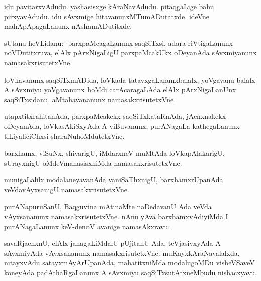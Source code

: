\documentclass{article}
\begin{document}
\begin{mn}
idu pavitarxvAdudu. yashasisxge kAraNavAdudu. pitaqgaLige bahu
pirxyavAdudu. idu sAvxmige hitavanunxMTumADutatxde. ideVne
mahApApagaLanunx nAshamADutitxde.
\end{mn}

%
%


\begin{mn}%
sUtanu heVLidanu:- parxpaMcagaLanunx saqSiTxsi, adara riVtigaLanunx
noVDutitxruva, elAlx pArxNigaLigU parxpaMcakUkx oDeyanAda sAvxmiyanunx namasakxrisutetxVne.
\end{mn}

\begin{mn}
loVkavanunx saqSiTxmADida, loVkada tatavxgaLanunxbalalx, yoVgavanu
balalx A sAvxmiyu yoVgavanunx hoMdi carAcaragaLAda elAlx
pArxNigaLanUnx saqSiTxsidanu. aMtahavananunx namasakxrisutetxVne.
\end{mn}

\begin{mn}
utapxtitxrahitanAda, parxpaMcakekx saqSiTxkataRnAda, jAcnxnakekx
oDeyanAda, loVkasAkiSxyAda A viBuvanunx, purANagaLa kathegaLanunx
tiLiyaliciChxsi sharaNuhoMdutetxVne.
\end{mn}

\begin{mn}
barxhamx, viSuNx, shivarigU, iMdarxneV muMtAda loVkapAlakarigU,
sUrayxnigU oMdeVmanasisxniMda namasakxrisutetxVne.
\end{mn}

\begin{mn}
munigaLalilx modalaneyavanAda vaniSaThxnigU, barxhamxrUpanAda
veVdavAyxsanigU namasakxrisutetxVne.
\end{mn}

\begin{mn}
purANapuruSanU, Baqguvina mAtinaMte naDedavanU Ada veVda vAyxsananunx
namasakxrisutetxVne. nAnu yAva barxhamxvAdiyiMda I purANagaLanunx
keV-denoV avanige namasAkxravu.
\end{mn}

\begin{mn}
savaRjacnxnU, elAlx janagaLiMdalU pUjitanU Ada, teVjasivxyAda A
sAvxmiyAda vAyxsananunx namasakxrisutetxVne. muKayxkAraNavalalxda,
nitayxvAdu satayxmAyArUpanAda, mahatitxniMda modalugoMDu visheVSaveV
koneyAda padAthaRgaLanunx A sAvxmiyu saqSiTxsutAtxneMbudu nishacxyavu.
\end{mn}
\end{document}
